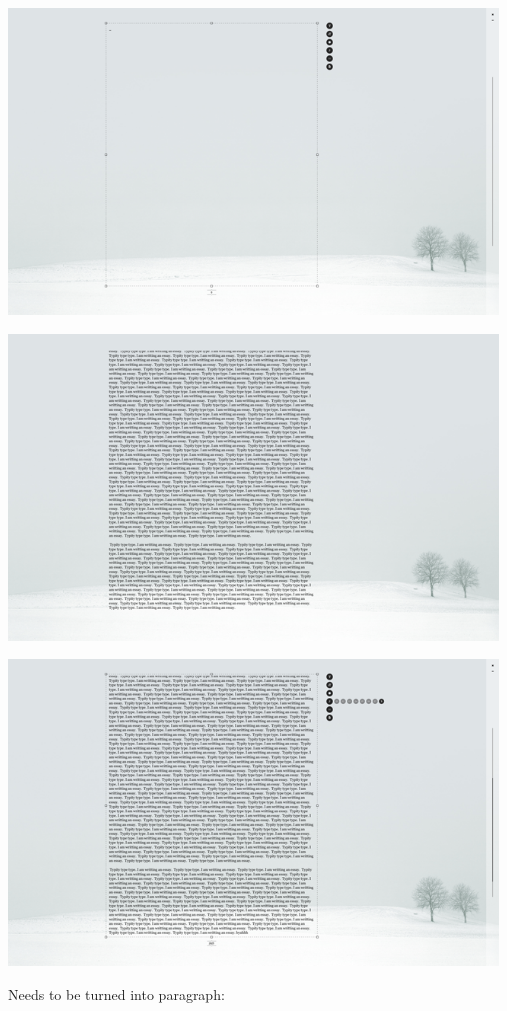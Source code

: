 \documentclass[11pt]{article}
\begin{document}
\includegraphics[width=130mm]{images/ommwriter1.png}

\includegraphics[width=130mm]{images/ommwriter2.png}

\includegraphics[width=130mm]{images/ommwriter3.png}

Needs to be turned into paragraph:
\end{document}

